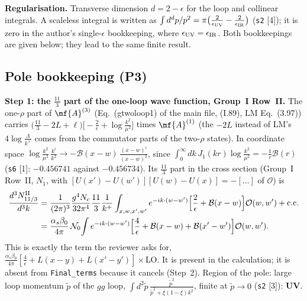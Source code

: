 \medskip
\noindent\textbf{Regularisation.} Transverse dimension $d=2-\epsilon$ for the loop and collinear integrals. A scaleless integral is written as $\int d^{d}p/p^{2}=\pi\big(\frac{2}{\epsilon_{\rm UV}}-\frac{2}{\epsilon_{\rm IR}}\big)$ (\texttt{s2} [4]); it is zero in the author's single-$\epsilon$ bookkeeping, where $\epsilon_{\rm UV}=\epsilon_{\rm IR}$. Both bookkeepings are given below; they lead to the same finite result.

\subsection{Pole bookkeeping (P3)}

\noindent\textbf{Step 1: the $\frac{11}{3}$ part of the one-loop wave function, Group~I Row~II.} The one-$\rho$ part of $\mf{A}^{(3)}$ (Eq.~(gtwoloop1) of the main file, (I.89), LM Eq.~(3.97)) carries $\big(\frac{11}{3}-2L+\ell\big)\big[-\frac{2}{\epsilon}+\log\frac{k^{2}}{\mu^{2}}\big]$ times $\mf{A}^{(1)}$ (the $-2L$ instead of LM's $4\log\frac{\Lambda}{k^{+}}$ comes from the commutator parts of the two-$\rho$ states). In coordinate space $\log\frac{k^{2}}{\mu^{2}}\,\frac{k^{i}}{k^{2}}\to-\mathcal{B}(x-w)\,\frac{(x-w)^{i}}{(x-w)^{2}}$, since $\int_{0}^{\infty}dk\,J_{1}(kr)\log\frac{k^{2}}{\mu^{2}}=-\frac{1}{r}\mathcal{B}(r)$ (\texttt{s6} [1]: $-0.456741$ against $-0.456734$). Its $\frac{11}{3}$ part in the cross section (Group~I Row~II, $N_{1}$, with $[U(x')-U(w')][U(w)-U(x)]=-[\dots]$ of $\mathcal{O}$) is
\begin{align}
\frac{d^{3}N^{\rm II}_{11/3}}{d^{3}k}&=\frac{1}{(2\pi)^{3}}\frac{g^{4}N_{c}}{32\pi^{4}}\frac{11}{3}\frac{1}{k^{+}}\int_{x,w,x',w'}e^{-ik\cdot(w-w')}\Big[\frac{2}{\epsilon}+\mathcal{B}(x-w)\Big]\mathcal{O}(w,w')+{\rm c.c.}\notag\\
&=\frac{\alpha_{s}\beta_{0}}{4\pi}\,\mathcal{N}_{0}\!\int e^{-ik\cdot(w-w')}\Big[\frac{4}{\epsilon}+\mathcal{B}(x-w)+\mathcal{B}(x'-w')\Big]\mathcal{O}(w,w').
\label{eq:pd-II}
\end{align}
This is exactly the term the reviewer asks for, $\frac{\alpha_{s}\beta_{0}}{4\pi}[\frac{4}{\epsilon}+L(x-y)+L(x'-y')]\times$LO. It is present in the calculation; it is absent from \texttt{Final\_terms} because it cancels (Step~2). Region of the pole: large loop momentum $\tilde p$ of the $gg$ loop, $\int d^{2}\tilde p\,\frac{\tilde p^{2}}{\tilde p^{2}+\xi(1-\xi)k^{2}}$, finite at $\tilde p\to0$ (\texttt{s2} [3]): \textbf{UV}.

